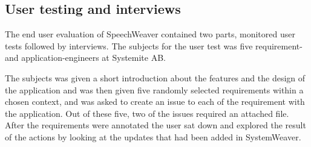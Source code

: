 \documentclass[conference]{IEEEtran}
\begin{document}



\subsection{User testing and interviews}

The end user evaluation of SpeechWeaver contained two parts, monitored user tests followed by interviews. 
The subjects for the user test was five requirement- and application-engineers at Systemite AB.

The subjects was given a short introduction about the features and the design of the application and was then given five randomly selected requirements within a chosen context, and was asked to create an issue to each of the requirement with the application. Out of these five, two of the issues required an attached file. After the requirements were annotated the user sat down and explored the result of the actions by looking at the updates that had been added in SystemWeaver. 
\end{document}
